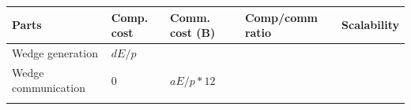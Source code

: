 \documentclass[10pt,oneside]{memoir}
\begin{document}
\begin{longtable}[]{@{}lllll@{}}
\toprule
\begin{minipage}[b]{0.23\columnwidth}\raggedright
Parts\strut
\end{minipage} & \begin{minipage}[b]{0.12\columnwidth}\raggedright
Comp. cost\strut
\end{minipage} & \begin{minipage}[b]{0.15\columnwidth}\raggedright
Comm. cost (B)\strut
\end{minipage} & \begin{minipage}[b]{0.22\columnwidth}\raggedright
Comp/comm ratio\strut
\end{minipage} & \begin{minipage}[b]{0.13\columnwidth}\raggedright
Scalability\strut
\end{minipage}\tabularnewline
\midrule
\endhead
\begin{minipage}[t]{0.23\columnwidth}\raggedright
Wedge generation\strut
\end{minipage} & \begin{minipage}[t]{0.12\columnwidth}\raggedright
\(dE/p\)\strut
\end{minipage} & \begin{minipage}[t]{0.15\columnwidth}\raggedright
\strut
\end{minipage} & \begin{minipage}[t]{0.22\columnwidth}\raggedright
\strut
\end{minipage} & \begin{minipage}[t]{0.13\columnwidth}\raggedright
\strut
\end{minipage}\tabularnewline
\begin{minipage}[t]{0.23\columnwidth}\raggedright
Wedge communication\strut
\end{minipage} & \begin{minipage}[t]{0.12\columnwidth}\raggedright
\(0\)\strut
\end{minipage} & \begin{minipage}[t]{0.15\columnwidth}\raggedright
\(aE/p * 12\)\strut
\end{minipage} & \begin{minipage}[t]{0.22\columnwidth}\raggedright
\strut
\end{minipage} & \begin{minipage}[t]{0.13\columnwidth}\raggedright
\strut
\end{minipage}\tabularnewline
\begin{minipage}[t]{0.23\columnwidth}\raggedright

\end{minipage}
\end{longtable}
\end{document}
